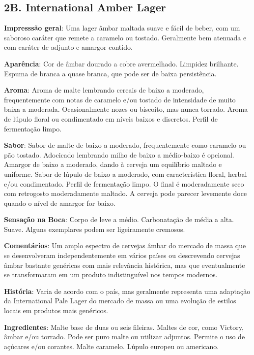 \subsection*{2B. International Amber Lager}

\textbf{Impresssão geral}: Uma lager âmbar maltada suave e fácil de beber, com um saboroso caráter que remete a caramelo ou tostado. Geralmente bem atenuada e com caráter de adjunto e amargor contido.

\textbf{Aparência}: Cor de âmbar dourado a cobre avermelhado. Limpidez brilhante. Espuma de branca a quase branca, que pode ser de baixa persistência.

\textbf{Aroma}: Aroma de malte lembrando cereais de baixo a moderado, frequentemente com notas de caramelo e/ou tostado de intensidade de muito baixa a moderada. Ocasionalmente nozes ou biscoito, mas nunca torrado. Aroma de lúpulo floral ou condimentado em níveis baixos e discretos. Perfil de fermentação limpo.

\textbf{Sabor}: Sabor de malte de baixo a moderado, frequentemente como caramelo ou pão tostado. Adocicado lembrando milho de baixo a médio-baixo é opcional. Amargor de baixo a moderado, dando à cerveja um equilíbrio maltado e uniforme. Sabor de lúpulo de baixo a moderado, com característica floral, herbal e/ou condimentado. Perfil de fermentação limpo. O final é moderadamente seco com retrogosto moderadamente maltado. A cerveja pode parecer levemente doce quando o nível de amargor for baixo.

\textbf{Sensação na Boca}: Corpo de leve a médio. Carbonatação de média a alta. Suave. Alguns exemplares podem ser ligeiramente cremosos.

\textbf{Comentários}: Um amplo espectro de cervejas âmbar do mercado de massa que se desenvolveram independentemente em vários países ou descrevendo cervejas âmbar bastante genéricas com mais relevância histórica, mas que eventualmente se transformaram em um produto indistinguível nos tempos modernos.

\textbf{História}: Varia de acordo com o país, mas geralmente representa uma adaptação da International Pale Lager do mercado de massa ou uma evolução de estilos locais em produtos mais genéricos.

\textbf{Ingredientes}: Malte base de duas ou seis fileiras. Maltes de cor, como Victory, âmbar e/ou torrado. Pode ser puro malte ou utilizar adjuntos. Permite o uso de açúcares e/ou corantes. Malte caramelo. Lúpulo europeu ou americano.

